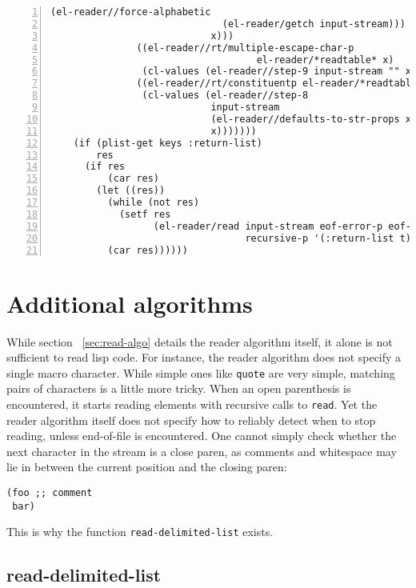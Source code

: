 \documentclass[a4paper,10pt,twoside]{report}
\newcommand{\fun}[1]{\texttt{#1}}
\newcommand{\Read}{\fun{read}}
\begin{document}
\begin{lstlisting}[style=lispcode,label={code:read-algo},caption={Code for the
    reader algorithm.},numbers=left]
                             (el-reader//force-alphabetic
                              (el-reader/getch input-stream)))
                            x)))
               ((el-reader//rt/multiple-escape-char-p
                                    el-reader/*readtable* x)
                (cl-values (el-reader//step-9 input-stream "" x)))
               ((el-reader//rt/constituentp el-reader/*readtable* x)
                (cl-values (el-reader//step-8
                            input-stream
                            (el-reader//defaults-to-str-props x)
                            x)))))))
    (if (plist-get keys :return-list)
        res
      (if res
          (car res)
        (let ((res))
          (while (not res)
            (setf res
                  (el-reader/read input-stream eof-error-p eof-value
                                  recursive-p '(:return-list t))))
          (car res))))))
\end{lstlisting}


\section{Additional algorithms}
\label{sec:add-algos}

While section ~\ref{sec:read-algo} details the reader algorithm itself, it alone
is not sufficient to read lisp code.  For instance, the reader algorithm does
not specify a single macro character.  While simple ones like \fun{quote} are
very simple, matching pairs of characters is a little more tricky.  When an open
parenthesis is encountered, it starts reading elements with recursive calls to
\Read{}.  Yet the reader algorithm itself does not specify how to reliably
detect when to stop reading, unless end-of-file is encountered.  One cannot
simply check whether the next character in the stream is a close paren, as
comments and whitespace may lie in between the current position and the closing
paren:

\begin{lstlisting}[style=lispinline]
(foo ;; comment
 bar)
\end{lstlisting}

This is why the function \fun{read-delimited-list} exists.

\subsection{read-delimited-list}
\label{subsec:read-delimited-list}
\end{document}
